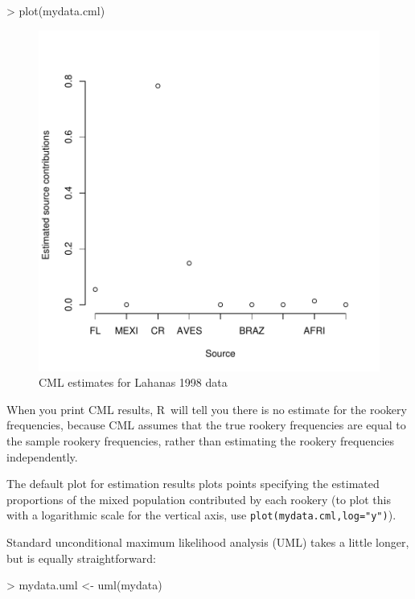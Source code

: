 \documentclass[11pt]{article}
\newcommand{\R}{{\sf R}}
\begin{document}
\begin{Schunk}
\begin{Sinput}
> plot(mydata.cml)
\end{Sinput}
\end{Schunk}

\begin{figure}
\includegraphics{mixstock-016}
\caption{CML estimates for Lahanas 1998 data}
\label{fig:cml1}
\end{figure}
When you print CML results, \R\ will tell you there is no estimate for
the rookery frequencies, because CML assumes that the true rookery
frequencies are equal to the sample rookery frequencies, rather than
estimating the rookery frequencies independently.

The default plot for estimation results plots
points specifying the estimated
proportions of the mixed population contributed by each
rookery (to plot this with a logarithmic scale
for the vertical axis, use
{\tt plot(mydata.cml,log="y")}).

Standard unconditional maximum likelihood analysis (UML)
takes a little longer, but is equally straightforward:
\begin{Schunk}
\begin{Sinput}
> mydata.uml <- uml(mydata)
\end{Sinput}
\end{Schunk}
\end{document}
